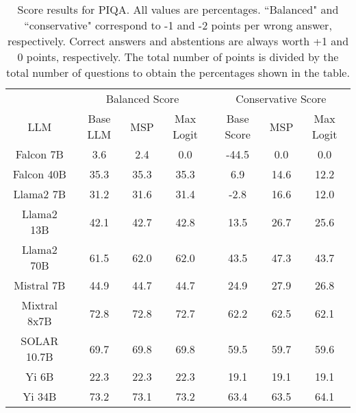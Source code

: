 \renewcommand\arraystretch{1.2}
\begin{table*}
\centering
\begin{tabular}{c|c|c|c|c|c|c}
& \multicolumn{3}{c|}{Balanced Score} & \multicolumn{3}{c}{Conservative Score} \\ 
LLM & Base LLM & MSP & Max Logit & Base Score & MSP & Max Logit\\ \hline
Falcon 7B & 3.6 & 2.4 & 0.0 & -44.5 & 0.0 & 0.0\\
Falcon 40B & 35.3 & 35.3 & 35.3 & 6.9 & 14.6 & 12.2\\
Llama2 7B & 31.2 & 31.6 & 31.4 & -2.8 & 16.6 & 12.0\\
Llama2 13B & 42.1 & 42.7 & 42.8 & 13.5 & 26.7 & 25.6\\
Llama2 70B & 61.5 & 62.0 & 62.0 & 43.5 & 47.3 & 43.7\\
Mistral 7B & 44.9 & 44.7 & 44.7 & 24.9 & 27.9 & 26.8\\
Mixtral 8x7B & 72.8 & 72.8 & 72.7 & 62.2 & 62.5 & 62.1\\
SOLAR 10.7B & 69.7 & 69.8 & 69.8 & 59.5 & 59.7 & 59.6\\
Yi 6B & 22.3 & 22.3 & 22.3 & 19.1 & 19.1 & 19.1\\
Yi 34B & 73.2 & 73.1 & 73.2 & 63.4 & 63.5 & 64.1\\
\hline
\end{tabular}
\caption{Score results for PIQA. All values are percentages. ``Balanced" and ``conservative" correspond to -1 and -2 points per wrong answer, respectively. Correct answers and abstentions are always worth +1 and 0 points, respectively. The total number of points is divided by the total number of questions to obtain the percentages shown in the table.}
\label{tab:piqa_score}
\end{table*}
